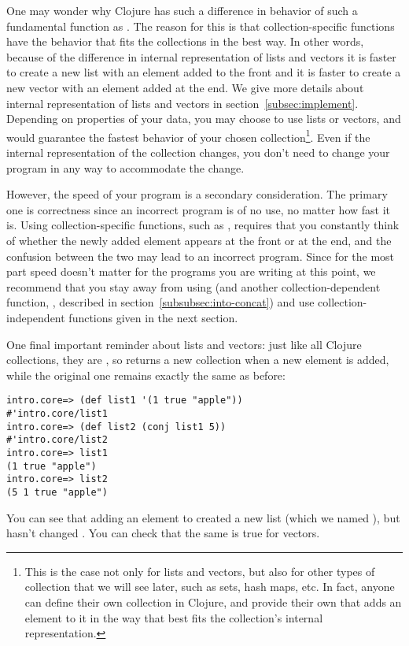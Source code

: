 One may wonder why Clojure has such a difference in behavior of such a fundamental function as . The reason for this is that collection-specific functions have the behavior that fits the collections  in the best way. In other words, because of the difference in internal representation of lists and vectors it is faster to create a new list with an element added to the front and it is faster to create a new vector with an element added at the end. We give more details about internal representation of lists and vectors in section~\ref{subsec:implement}. Depending on properties of your data, you may choose to use lists or vectors, and  would guarantee the fastest behavior of your chosen collection\footnote{This is the case not only for lists and vectors, but also for other types of collection that we will see later, such as sets, hash maps, etc. In fact, anyone can define their own collection in Clojure, and provide their own  that adds an element to it in the way that best fits the collection's internal representation.}. Even if the internal representation of the collection changes, you don't need to change your program in any way to accommodate the change. 

However, the speed of your program is a secondary consideration. The primary one is correctness since an incorrect program is of no use, no matter how fast it is. Using collection-specific functions, such as , requires that you constantly think of whether the newly added element appears at the front or at the end, and the confusion between the two may lead to an incorrect program. Since for the most part speed doesn't matter for the programs you are writing at this point, we recommend that you stay away from using  (and another collection-dependent function, , described in section~\ref{subsubsec:into-concat}) and use collection-independent functions given in the next section. 

One final important reminder about lists and vectors:  just like all Clojure collections, they are , so  returns a new collection when a new element is added, while the original one remains exactly the same as before:
\begin{framed}
\begin{verbatim}
intro.core=> (def list1 '(1 true "apple"))
#'intro.core/list1
intro.core=> (def list2 (conj list1 5))
#'intro.core/list2
intro.core=> list1
(1 true "apple")
intro.core=> list2
(5 1 true "apple")
\end{verbatim}
\end{framed}
You can see that adding an element  to  created a new list (which we named ), but hasn't changed . You can check that the same is true for vectors. 

